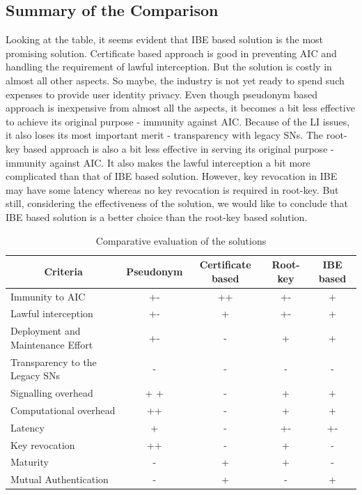 \documentclass[conference]{IEEEtran}
\begin{document}
\subsection{Summary of the Comparison}
Looking at the table, it seems evident that IBE based solution is the most promising solution. Certificate based approach is good in preventing AIC and handling the requirement of lawful interception. But the solution is costly in almost all other aspects. So maybe, the industry is not yet ready to spend such expenses to provide user identity privacy. Even though pseudonym based approach is inexpensive from almost all the aspects, it becomes a bit less effective to achieve its original purpose - immunity against AIC. Because of the LI issues, it also loses its most important merit - transparency with legacy SNs. The root-key based approach is also a bit less effective in serving its original purpose - immunity against AIC. It also makes the lawful interception a bit more complicated than that of IBE based solution. However, key revocation in IBE may have some latency whereas no key revocation is required in root-key. But still, considering the effectiveness of the solution, we would like to conclude that IBE based solution is a better choice than the root-key based solution.


\begin{table}
\begin{small}
\begin{center}
\caption{Comparative evaluation of the solutions}
\begin{tabular}[t]{|l|c|c|c|c|}
\hline
\multicolumn{1}{|c|}{\textbf{Criteria}} & \multicolumn{1}{|c|}{\textbf{Pseudonym}} & \multicolumn{1}{|c|}{\textbf{Certificate based}} & \multicolumn{1}{|c|}{\textbf{Root-key}} & \multicolumn{1}{|c|}{\textbf{IBE based}}\\
\hline \hline
Immunity to AIC & +- & ++ & +- & + \\ \hline
Lawful interception & +- & + & +- & + \\ \hline
Deployment and Maintenance Effort & +- & - & + & + \\ \hline
Transparency to the Legacy SNs & - & - & - & - \\ \hline
Signalling overhead & + + & - & + & + \\ \hline
Computational overhead & ++ & - & + & + \\ \hline
Latency & + & - & +- & +- \\ \hline
Key revocation & ++ & - & + & - \\ \hline
Maturity  & - & + & + & - \\ \hline
Mutual Authentication & - & + & - & + \\ \hline
\end{tabular}
\label{table:comparison}
\end{center}
\end{small}
\end{table}
\end{document}
